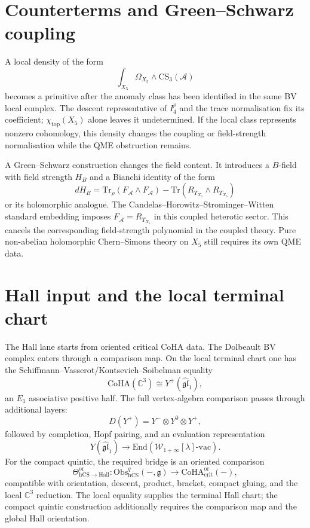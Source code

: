 \documentclass[11pt]{amsart}
\providecommand{\hCS}{\mathrm{hCS}}
\providecommand{\fg}{\mathfrak{g}}
\providecommand{\cA}{\mathcal{A}}
\providecommand{\Tr}{\mathrm{Tr}}
\providecommand{\CoHA}{\mathrm{CoHA}}
\providecommand{\End}{\mathrm{End}}
\begin{document}
\section*{Counterterms and Green--Schwarz coupling}
\label{sec:hcs-quintic-counterterms}

A local density of the form
\[
  \int_{X_5}\Omega_{X_5}\wedge \mathrm{CS}_3(\cA)
\]
becomes a primitive after the anomaly class has been identified in the
same BV local complex. The descent representative of $I_4^\rho$ and
the trace normalisation fix its coefficient; $\chi_{\mathrm{top}}(X_5)$
alone leaves it undetermined. If the local class
represents nonzero cohomology, this density changes the coupling or
field-strength normalisation while the QME obstruction remains.

A Green--Schwarz construction changes the field content. It introduces
a $B$-field with field strength $H_B$ and a Bianchi identity of the
form
\[
  dH_B =
  \Tr_\rho(F_\cA\wedge F_\cA)-\Tr(R_{T_{X_5}}\wedge R_{T_{X_5}})
\]
or its holomorphic analogue. The Candelas--Horowitz--Strominger--Witten
standard embedding imposes $F_\cA=R_{T_{X_5}}$ in this coupled
heterotic sector. This cancels the corresponding field-strength
polynomial in the coupled theory. Pure non-abelian holomorphic
Chern--Simons theory on $X_5$ still requires its own QME data.

\section*{Hall input and the local terminal chart}
\label{sec:hcs-quintic-hall-input}

The Hall lane starts from oriented critical CoHA data. The Dolbeault BV
complex enters through a comparison map. On the local terminal chart
one has the Schiffmann--Vasserot/Kontsevich--Soibelman equality
\[
  \CoHA(\mathbb C^3)\cong Y^+(\widehat{\mathfrak{gl}}_1),
\]
an $E_1$ associative positive half. The full vertex-algebra comparison
passes through additional layers:
\[
  D(Y^+)=Y^-\otimes Y^0\otimes Y^+,
\]
followed by completion, Hopf pairing, and an evaluation representation
\[
  Y(\widehat{\mathfrak{gl}}_1)\longrightarrow
  \End\!\left(\mathcal W_{1+\infty}[\lambda]\text{-vac}\right).
\]
For the compact quintic, the required bridge is an oriented comparison
\[
  \Theta_{\hCS\to\mathrm{Hall}}^{\mathrm{or}}\colon
  \mathrm{Obs}_{\hCS}^{q}(-,\fg)
  \longrightarrow
  \CoHA_{\mathrm{crit}}^{\mathrm{or}}(-),
\]
compatible with orientation, descent, product, bracket, compact gluing,
and the local $\mathbb C^3$ reduction. The local equality supplies the
terminal Hall chart; the compact quintic construction additionally
requires the comparison map and the global Hall orientation.
\end{document}
